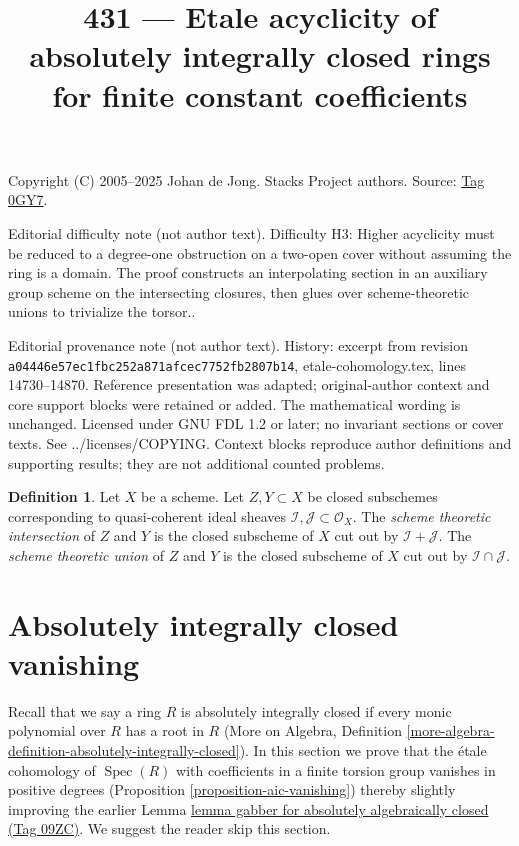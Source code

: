 \documentclass{amsart}
\theoremstyle{plain}
\theoremstyle{definition}
\newtheorem{definition}[subsection]{Definition}
\theoremstyle{remark}
\numberwithin{equation}{subsection}
\def\Spec{\mathop{\mathrm{Spec}}}
\begin{document}
\title[Stacks Project, Tag 0GY7]{431 --- Etale acyclicity of absolutely integrally closed rings for finite constant coefficients}
\maketitle
\noindent Copyright (C) 2005--2025 Johan de Jong. Stacks Project authors. Source: \href{https://stacks.math.columbia.edu/tag/0GY7}{Tag 0GY7}.

\noindent Editorial difficulty note (not author text). Difficulty H3: Higher acyclicity must be reduced to a degree-one obstruction on a two-open cover without assuming the ring is a domain. The proof constructs an interpolating section in an auxiliary group scheme on the intersecting closures, then glues over scheme-theoretic unions to trivialize the torsor..

\noindent Editorial provenance note (not author text). History: excerpt from revision \texttt{a0444\allowbreak 6e57e\allowbreak c1fbc\allowbreak 252a8\allowbreak 71afc\allowbreak ec775\allowbreak 2fb28\allowbreak 07b14}, etale-cohomology.tex, lines 14730--14870. Reference presentation was adapted; original-author context and core support blocks were retained or added. The mathematical wording is unchanged. Licensed under GNU FDL 1.2 or later; no invariant sections or cover texts. See ../licenses/COPYING. Context blocks reproduce author definitions and supporting results; they are not additional counted problems.

\begin{definition}
\label{morphisms-definition-scheme-theoretic-intersection-union}
Let $X$ be a scheme. Let $Z, Y \subset X$ be closed subschemes
corresponding to quasi-coherent ideal sheaves
$\mathcal{I}, \mathcal{J} \subset \mathcal{O}_X$.
The {\it scheme theoretic intersection} of $Z$ and $Y$
is the closed subscheme of $X$ cut out by $\mathcal{I} + \mathcal{J}$.
The {\it scheme theoretic union} of $Z$ and $Y$
is the closed subscheme of $X$ cut out by
$\mathcal{I} \cap \mathcal{J}$.
\end{definition}

\section{Absolutely integrally closed vanishing}
\label{section-aic-vanishing}

\noindent
Recall that we say a ring $R$ is absolutely integrally closed
if every monic polynomial over $R$ has a root in $R$
(More on Algebra, Definition
\ref{more-algebra-definition-absolutely-integrally-closed}).
In this section we prove that the \'etale cohomology of
$\Spec(R)$ with coefficients in a finite torsion group
vanishes in positive degrees (Proposition \ref{proposition-aic-vanishing})
thereby slightly improving the earlier
Lemma \href{https://stacks.math.columbia.edu/tag/09ZC}{lemma gabber for absolutely algebraically closed (Tag 09ZC)}.
We suggest the reader skip this section.
\end{document}
